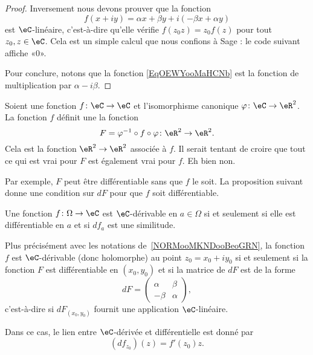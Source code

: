 \begin{proof}
    Inversement nous devons prouver que la fonction
    \begin{equation}        \label{EqOEWYooMaHCNb}
        f(x+iy)=\alpha x+\beta y+i(-\beta x+\alpha y)
    \end{equation}
    est \( \eC\)-linéaire, c'est-à-dire qu'elle vérifie \( f(z_0z)=z_0f(z)\) pour tout \( z_0,z\in \eC\). Cela est un simple calcul que nous confions à Sage : le code suivant affiche «\( 0\)».
    

    Pour conclure, notons que la fonction \eqref{EqOEWYooMaHCNb} est la fonction de multiplication par \( \alpha-i\beta\).
\end{proof}

\begin{normaltext}      \label{NORMooMKNDooBeoGRN}
    Soient une fonction \( f\colon \eC\to \eC\) et l'isomorphisme canonique \( \varphi\colon \eC\to \eR^2\). La fonction \( f\) définit une la fonction
    \begin{equation}
        F=\varphi^{-1} \circ f\circ \varphi\colon \eR^2\to \eR^2.
    \end{equation}
    Cela est la fonction \( \eR^2\to \eR^2\) associée à \( f\). Il serait tentant de croire que tout ce qui est vrai pour \( F\) est également vrai pour \( f\). Eh bien non.

    Par exemple, \( F\) peut être différentiable sans que \( f\) le soit. La proposition suivant donne une condition sur \( dF\) pour que \( f\) soit différentiable.
\end{normaltext}

\begin{proposition}     \label{PropKJUDooJfqgYS}
    Une fonction \( f\colon \Omega\to \eC\) est $\eC$-dérivable en \( a\in\Omega\) si et seulement si elle est différentiable en \( a\) et si \( df_a\) est une similitude.

    Plus précisément avec les notations de~\ref{NORMooMKNDooBeoGRN}, la fonction \( f\) est $\eC$-dérivable (donc holomorphe) au point \( z_0=x_0+iy_0\) si et seulement si la fonction \( F\) est différentiable en \( (x_0,y_0)\) et si la matrice de \( dF\) est de la forme
    \begin{equation}        \label{EQooWZGKooLDEHGr}
        dF=\begin{pmatrix}
            \alpha    &   \beta    \\
            -\beta    &   \alpha
        \end{pmatrix},
    \end{equation}
    c'est-à-dire si \( dF_{(x_0,y_0)}\) fournit une application \( \eC\)-linéaire.

    Dans ce cas, le lien entre \( \eC\)-dérivée et différentielle est donné par
    \begin{equation}        \label{EqPAEFooYNhYpz}
        (df_{z_0})(z)=f'(z_0)z.
    \end{equation}
\end{proposition}

